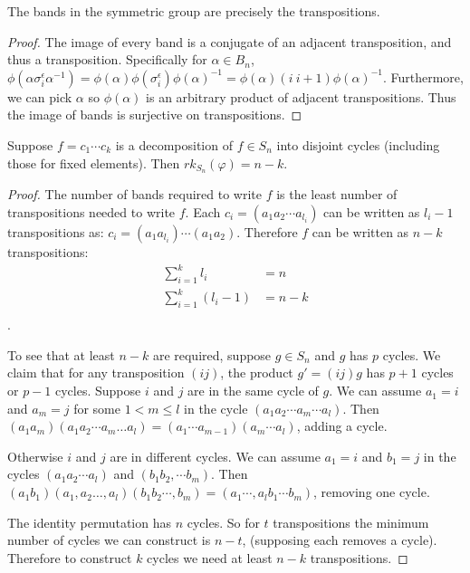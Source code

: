 \documentclass[12pt]{thesis}
\begin{document}
\begin{proposition}
    \label{prop:bands-are-transpositions}
    The bands in the symmetric group are precisely the transpositions.
\end{proposition}

\begin{proof}
    The image of every band
    is a conjugate of an adjacent transposition,
    and thus a transposition.
    Specifically for $\alpha \in B_{n}$,
    $\phi(\alpha\sigma_{i}^{\epsilon}\alpha^{-1}) = \phi(\alpha)\phi(\sigma_{i}^{\epsilon})\phi(\alpha)^{-1} = \phi(\alpha) (i\ i+1) \phi(\alpha)^{-1}$.
    Furthermore, we can pick $\alpha$ so $\phi(\alpha)$ is an arbitrary
    product of adjacent transpositions.
    Thus the image of bands is surjective on transpositions.
\end{proof}

\begin{proposition}
    Suppose $f = c_{1} \cdots c_{k}$ is a decomposition
    of $f \in S_{n}$ into disjoint cycles (including those for fixed elements).
    Then $rk_{S_{n}}(\varphi) = n - k$.
\end{proposition}

\begin{proof}
    The number of bands required to write $f$
    is the least number of transpositions needed
    to write $f$.
    Each $c_{i} = (a_{1} a_{2} \cdots a_{l_{i}})$ can be written
    as $l_{i} - 1$  transpositions
    as: $c_{i} = (a_{1}a_{l_{i}}) \cdots (a_{1} a_{2})$.
    Therefore $f$ can be written as $n - k$ transpositions:
    \[
    \begin{split}
        \sum_{i=1}^{k} l_{i} &= n  \\
        \sum_{i=1}^{k} (l_{i} - 1) &= n - k \\
    \end{split}
    \].

    To see that at least $n - k$ are required, suppose $g \in S_{n}$
    and $g$ has $p$ cycles.
    We claim that for any transposition $(i j)$,
    the product $g' = (i j)g$ has $p+1$ cycles 
    or $p - 1$ cycles.
    Suppose $i$ and $j$ are in the same cycle of $g$.
    We can assume $a_{1} = i$ and $a_{m} = j$ for some $1 < m \leq l$ in the cycle $(a_{1} a_{2} \cdots a_{m} \cdots a_{l})$.
    Then $(a_{1} a_{m}) (a_{1} a_{2} \cdots a_{m} \ldots a_{l}) = (a_{1} \cdots a_{m - 1}) (a_{m} \cdots a_{l})$,
    adding a cycle.

    Otherwise $i$ and $j$ are in different cycles.
    We can assume $a_{1} = i$ and $b_{1} = j$ in the cycles $(a_{1} a_{2} \cdots a_{l})$
    and $(b_{1} b_{2}, \cdots b_{m})$.
    Then $(a_{1} b_{1}) (a_{1}, a_{2} \ldots, a_{l}) (b_{1} b_{2} \cdots, b_{m})
    = (a_{1} \cdots, a_{l}b_{1} \cdots b_{m})$,
    removing one cycle.

    The identity permutation has $n$ cycles.
    So for $t$ transpositions the minimum number of
    cycles we can construct is $n - t$,
    (supposing each removes a cycle).
    Therefore to construct $k$ cycles
    we need at least $n - k$ transpositions.
\end{proof}
\end{document}
